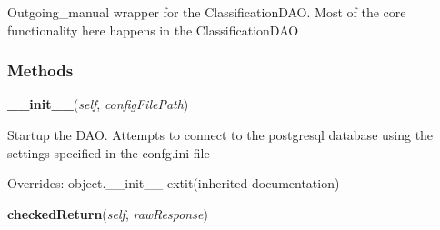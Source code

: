 Outgoing\_manual wrapper for the ClassificationDAO. Most of the core 
functionality here happens in the ClassificationDAO



  \subsubsection{Methods}

    \vspace{0.5ex}

\hspace{.8\funcindent}\begin{boxedminipage}{\funcwidth}

    \raggedright \textbf{\_\_init\_\_}(\textit{self}, \textit{configFilePath})

\setlength{\parskip}{2ex}
    Startup the DAO. Attempts to connect to the postgresql database using 
    the settings specified in the confg.ini file

\setlength{\parskip}{1ex}
      Overrides: object.\_\_init\_\_ 	extit{(inherited documentation)}

    \end{boxedminipage}

    \label{src:dao:outgoing_manual_dao:OutgoingManualDAO:checkedReturn}

    \vspace{0.5ex}

\hspace{.8\funcindent}\begin{boxedminipage}{\funcwidth}

    \raggedright \textbf{checkedReturn}(\textit{self}, \textit{rawResponse})

\setlength{\parskip}{2ex}
\setlength{\parskip}{1ex}
    \end{boxedminipage}

    \vspace{0.5ex}

